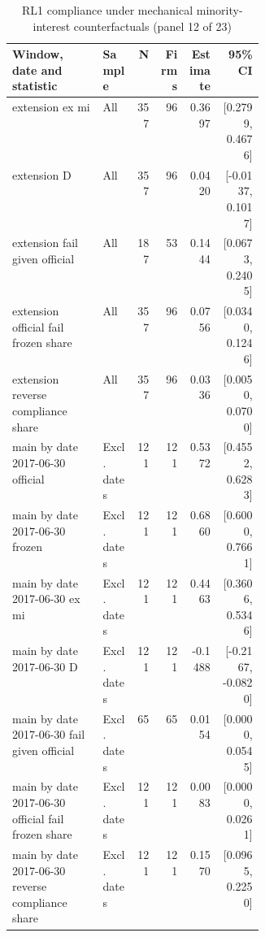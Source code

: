 \begin{table}[!htbp]\centering\scriptsize
\caption{RL1 compliance under mechanical minority-interest counterfactuals (panel 12 of 23)}
\begin{threeparttable}
\begin{tabular}{p{0.36\linewidth}lrrrr}
\toprule
Window, date and statistic & Sample & N & Firms & Estimate & 95\% CI \\
\midrule
extension  ex mi & All & 357 & 96 & 0.3697 & [0.2799, 0.4676] \\
extension  D & All & 357 & 96 & 0.0420 & [-0.0137, 0.1017] \\
extension  fail given official & All & 187 & 53 & 0.1444 & [0.0673, 0.2405] \\
extension  official fail frozen share & All & 357 & 96 & 0.0756 & [0.0340, 0.1246] \\
extension  reverse compliance share & All & 357 & 96 & 0.0336 & [0.0050, 0.0700] \\
main by date 2017-06-30 official & Excl. dates & 121 & 121 & 0.5372 & [0.4552, 0.6283] \\
main by date 2017-06-30 frozen & Excl. dates & 121 & 121 & 0.6860 & [0.6000, 0.7661] \\
main by date 2017-06-30 ex mi & Excl. dates & 121 & 121 & 0.4463 & [0.3606, 0.5346] \\
main by date 2017-06-30 D & Excl. dates & 121 & 121 & -0.1488 & [-0.2167, -0.0820] \\
main by date 2017-06-30 fail given official & Excl. dates & 65 & 65 & 0.0154 & [0.0000, 0.0545] \\
main by date 2017-06-30 official fail frozen share & Excl. dates & 121 & 121 & 0.0083 & [0.0000, 0.0261] \\
main by date 2017-06-30 reverse compliance share & Excl. dates & 121 & 121 & 0.1570 & [0.0965, 0.2250] \\
\bottomrule
\end{tabular}
\begin{tablenotes}[flushleft]\footnotesize

\end{tablenotes}
\end{threeparttable}
\end{table}
